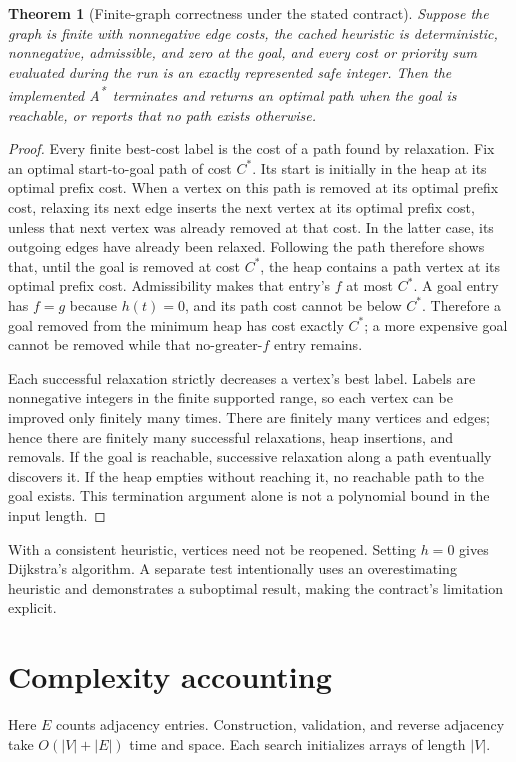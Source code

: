 \documentclass[11pt,a4paper]{article}
\newtheorem{theorem}{Theorem}
\newcommand{\astar}{A\textsuperscript{*}}
\begin{document}
\begin{theorem}[Finite-graph correctness under the stated contract]
Suppose the graph is finite with nonnegative edge costs, the cached heuristic is deterministic, nonnegative, admissible, and zero at the goal, and every cost or priority sum evaluated during the run is an exactly represented safe integer. Then the implemented \astar\ terminates and returns an optimal path when the goal is reachable, or reports that no path exists otherwise.
\end{theorem}
\begin{proof}
Every finite best-cost label is the cost of a path found by relaxation. Fix an optimal start-to-goal path of cost $C^*$. Its start is initially in the heap at its optimal prefix cost. When a vertex on this path is removed at its optimal prefix cost, relaxing its next edge inserts the next vertex at its optimal prefix cost, unless that next vertex was already removed at that cost. In the latter case, its outgoing edges have already been relaxed. Following the path therefore shows that, until the goal is removed at cost $C^*$, the heap contains a path vertex at its optimal prefix cost. Admissibility makes that entry's $f$ at most $C^*$. A goal entry has $f=g$ because $h(t)=0$, and its path cost cannot be below $C^*$. Therefore a goal removed from the minimum heap has cost exactly $C^*$; a more expensive goal cannot be removed while that no-greater-$f$ entry remains.

Each successful relaxation strictly decreases a vertex's best label. Labels are nonnegative integers in the finite supported range, so each vertex can be improved only finitely many times. There are finitely many vertices and edges; hence there are finitely many successful relaxations, heap insertions, and removals. If the goal is reachable, successive relaxation along a path eventually discovers it. If the heap empties without reaching it, no reachable path to the goal exists. This termination argument alone is not a polynomial bound in the input length.
\end{proof}
With a consistent heuristic, vertices need not be reopened. Setting $h=0$ gives Dijkstra's algorithm. A separate test intentionally uses an overestimating heuristic and demonstrates a suboptimal result, making the contract's limitation explicit.

\section{Complexity accounting}
Here $E$ counts adjacency entries. Construction, validation, and reverse adjacency take $O(|V|+|E|)$ time and space. Each search initializes arrays of length $|V|$.
\end{document}
